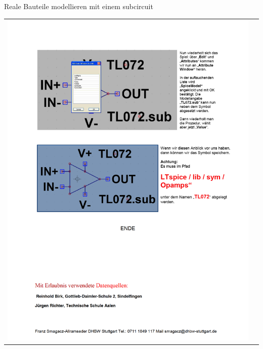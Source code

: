 \begin{frame}[t]{Reale Bauteile modellieren mit einem subcircuit}

    \begin{spacing}{0.9} \begin{tiny}
            \begin{table}[h!]
                \begin{tabular}{p{5cm} p{5cm}}
                    \begin{minipage}{0.5\textwidth}
                        \includegraphics[width=\linewidth]{pictures/legacy/tl072_5.png}
                    \end{minipage}
                     &
                    \begin{minipage}{0.5\textwidth}

                    \end{minipage}
                \end{tabular}
            \end{table}
        \end{tiny} \end{spacing}
\end{frame}

